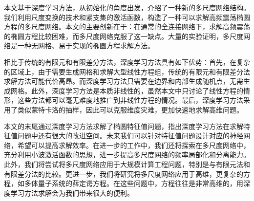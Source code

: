 

本文基于深度学习方法，从初始化的角度出发，介绍了一种新的多尺度网络结构。我们利用尺度变换的技术和紧支集的激活函数，构造了一种可以求解高频震荡椭圆方程的多尺度网络。本文的主要创新在于：在通常的全连接网络下，求解高频震荡的椭圆方程比较困难，而多尺度网络克服了这一缺点。大量的实验证明，多尺度网络是一种无网格、易于实现的椭圆方程求解方法。

相比于传统的有限元和有限差分方法，深度学习方法具有如下优势：首先，在复杂的区域上，由于需要生成网格和求解大型线性方程组，传统的有限元和有限差分法求解方法可能代价高昂。而深度学习方法只需要在边界和内部生成随机点，无需生成网格。此外，深度学习方法是本质非线性的，虽然本文中只讨论了线性方程的情形，这些方法都可以毫无难度地推广到非线性方程的情况。最后，深度学习方法采用了类似蒙特卡洛的抽样，因此可以克服维度灾难，更加快速地求解高维问题。

本文的末尾通过深度学习方法求解了椭圆特征值问题，指出深度学习方法在求解特征值问题中还有很大的改进空间。未来我们可以针对特征值问题设计对应的神经网络，希望可以提高求解效率。在进一步的工作中，我们还将探索在多尺度网络中，充分利用小波激活函数的思想，进一步提高多尺度网络的频率局部化和分离能力。此外，我们将尝试将多尺度网络应用于大规模计算工程问题，特别是与有限元法和有限差分法的比较。更进一步，我们将研究将多尺度网络应用于高维，更复杂的方程，如多体量子系统的薛定谔方程。在这些问题中，方程往往是非常高维的，用深度学习方法求解会为我们带来很大的便利。
